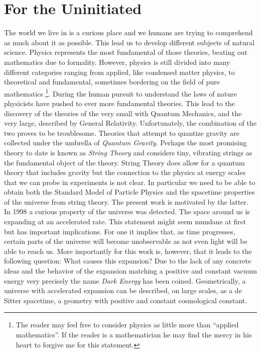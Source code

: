 \documentclass[a4paper,12pt]{report}
\begin{document}
\tableofcontents

\newpage
{}
\chapter{For the Uninitiated}
The world we live in is a curious place and we humans are trying to comprehend as much about it as possible. This lead us to develop different subjects of natural science. Physics represents the most fundamental of those theories, beating out mathematics due to formality. However, physics is still divided into many different categories ranging from applied, like condensed matter physics, to theoretical and fundamental, sometimes bordering on the field of pure mathematics \footnote{The reader may feel free to consider physics as little more than ``applied mathematics''. If the reader is a mathematician he may find the mercy in his heart to forgive me for this statement.}. During the human pursuit to understand the laws of nature physicists have pushed to ever more fundamental theories. This lead to the discovery of the theories of the very small with Quantum Mechanics, and the very large, described by General Relativity. Unfortunately, the combination of the two proves to be troublesome. Theories that attempt to quantize gravity are collected under the umbrella of \emph{Quantum Gravity}. Perhaps the most promising theory to date is known as \emph{String Theory} and considers tiny, vibrating strings as the fundamental object of the theory. String Theory does allow for a quantum theory that includes gravity but the connection to the physics at energy scales that we can probe in experiments is not clear. In particular we need to be able to obtain both the Standard Model of Particle Physics and the spacetime properties of the universe from string theory. The present work is motivated by the latter.\\
In 1998 a curious property of the universe was detected. The space around us is expanding at an accelerated rate. This statement might seem mundane at first but has important implications. For one it implies that, as time  progresses, certain parts of the universe will become unobservable as not even light will be able to reach us. More importantly for this work is, however, that it leads to the following question: What causes this expansion? Due to the lack of any concrete ideas and the behavior of the expansion matching a positive and constant vacuum energy very precisely the name \emph{Dark Energy} has been coined. Geometrically, a universe with accelerated expansion can be described, on large scales, as a de Sitter spacetime, a geometry with positive and constant cosmological constant.\\
\end{document}
